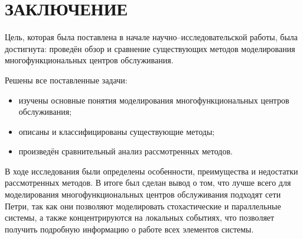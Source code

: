 \chapter*{ЗАКЛЮЧЕНИЕ}

Цель, которая была поставлена в начале научно--исследовательской работы, была достигнута: проведён обзор и сравнение существующих методов моделирования многофункциональных центров обслуживания.

Решены все поставленные задачи:
\begin{itemize}[label=---]
	\item изучены основные понятия моделирования многофункциональных центров обслуживания;
	\item описаны и классифицированы существующие методы;
	\item произведён сравнительный анализ рассмотренных методов.
\end{itemize}

В ходе исследования были определены особенности, преимущества и недостатки рассмотренных методов. В итоге был сделан вывод о том, что лучше всего для моделирования многофункциональных центров обслуживания подходят сети Петри, так как они позволяют моделировать стохастические и параллельные системы, а также концентрируются на локальных событиях, что позволяет получить подробную информацию о работе всех элементов системы.